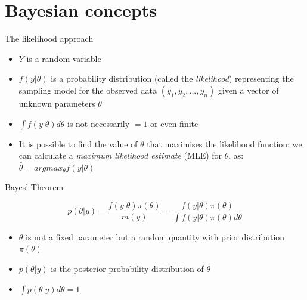 
\section{Bayesian concepts}

\begin{frame}{The likelihood approach}

	\begin{block}{}
		\begin{itemize}
			\item $Y$ is a random variable
			\item $f({y}|{\theta})$ is a probability distribution (called 
			the \textit{likelihood}) representing the sampling model for the observed 
			data $(y_1,y_2,...,y_n)$ given a vector of unknown parameters ${\theta}$
			\item $\int f({y}|{\theta})d{\theta}$ is not necessarily $=1$ or even finite
			\item It is possible to find the value of ${\theta}$ that maximises the 
			likelihood function: we can calculate 
			a \textit{maximum likelihood estimate} (MLE) for ${\theta}$, as: 
			$\hat{{\theta}}=argmax_{{\theta}}f({y}|{\theta})$
		\end{itemize}
	\end{block}

\end{frame}


\begin{frame}{Bayes' Theorem}

	\begin{block}{}
		\begin{equation}
			p({\theta}|{y}) = \frac{f({y}|{\theta})\pi({\theta})}{m({y})} = \frac{f({y}|{\theta})\pi({\theta})}{\int f({y}|{\theta})\pi({\theta}) d{\theta}}
		\end{equation}
	\end{block}

	\begin{itemize}
		\item ${\theta}$ is not a fixed parameter but a random quantity with 
		prior distribution $\pi({\theta})$
		\item $p({\theta}|{y})$ is the posterior probability distribution of ${\theta}$
		\item $\int p({\theta}|{y})d{\theta}=1$
	\end{itemize}

\end{frame}

